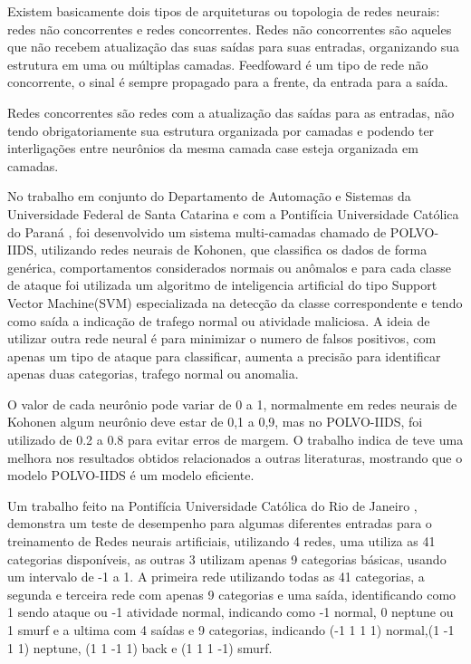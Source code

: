 \documentclass[
	12pt,				%
	openright,			%
	oneside,
	a4paper,			%
	english,			%
	french,				%
	spanish,			%
	brazil				%
	]{abntex2}
\begin{document}
Existem basicamente dois tipos  de arquiteturas ou topologia de redes neurais: redes não concorrentes e redes concorrentes.
Redes não concorrentes são aqueles que não recebem atualização das suas saídas para suas entradas, organizando sua estrutura em  uma ou múltiplas camadas. 
Feedfoward é um tipo de rede não concorrente,  o sinal é sempre propagado para a frente, da entrada para a saída. 

Redes concorrentes são redes com a atualização das saídas para as entradas, não tendo obrigatoriamente sua estrutura organizada por camadas e podendo ter interligações entre neurônios da mesma camada case esteja organizada em camadas. 


No trabalho em conjunto do Departamento de Automação e Sistemas da Universidade Federal de Santa Catarina \cite{polvo1} e com a Pontifícia Universidade Católica do Paraná \cite{polvo2}, foi desenvolvido um sistema multi-camadas chamado de POLVO-IIDS, utilizando redes neurais de Kohonen, que classifica os dados de forma genérica, comportamentos considerados normais ou anômalos e para cada classe de ataque foi utilizada um algoritmo de inteligencia artificial do tipo Support Vector Machine(SVM) especializada na detecção da classe correspondente e tendo como saída a indicação de trafego normal ou atividade maliciosa.
A ideia de utilizar outra rede neural é para minimizar o numero de falsos positivos, com apenas um tipo de ataque para classificar, aumenta a precisão para identificar apenas duas categorias, trafego normal ou anomalia.

O valor de cada neurônio pode variar de 0 a 1, normalmente em redes neurais de Kohonen algum neurônio deve estar de 0,1 a 0,9, mas no POLVO-IIDS, foi utilizado de 0.2 a 0.8 para evitar erros de margem. 
O trabalho indica de teve uma melhora nos resultados obtidos relacionados a outras literaturas, mostrando que o modelo POLVO-IIDS é um modelo eficiente.


Um trabalho feito na Pontifícia Universidade Católica do Rio de Janeiro \cite{RenatoMaia}, demonstra um teste de desempenho para algumas diferentes entradas para o treinamento de Redes neurais artificiais,
utilizando 4 redes,  uma utiliza as 41 categorias disponíveis, as outras 3 utilizam apenas 9 categorias básicas, usando um intervalo de -1 a 1. A primeira rede utilizando todas as 41 categorias, a segunda e terceira rede com apenas 9 categorias e uma saída, identificando como 1 sendo ataque ou -1 atividade normal, indicando como -1 normal, 0 neptune ou 1 smurf e a ultima com 4 saídas e 9 categorias, indicando (-1 1 1 1) normal,(1 -1 1 1) neptune, (1 1 -1 1) back e (1 1 1 -1) smurf. 
\end{document}
